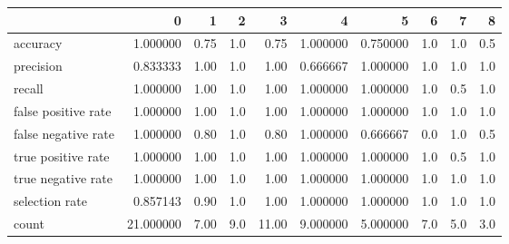 \begin{tabular}{lrrrrrrrrr}
\toprule
{} &          0 &     1 &    2 &      3 &         4 &         5 &    6 &    7 &    8 \\
\midrule
accuracy            &   1.000000 &  0.75 &  1.0 &   0.75 &  1.000000 &  0.750000 &  1.0 &  1.0 &  0.5 \\
precision           &   0.833333 &  1.00 &  1.0 &   1.00 &  0.666667 &  1.000000 &  1.0 &  1.0 &  1.0 \\
recall              &   1.000000 &  1.00 &  1.0 &   1.00 &  1.000000 &  1.000000 &  1.0 &  0.5 &  1.0 \\
false positive rate &   1.000000 &  1.00 &  1.0 &   1.00 &  1.000000 &  1.000000 &  1.0 &  1.0 &  1.0 \\
false negative rate &   1.000000 &  0.80 &  1.0 &   0.80 &  1.000000 &  0.666667 &  0.0 &  1.0 &  0.5 \\
true positive rate  &   1.000000 &  1.00 &  1.0 &   1.00 &  1.000000 &  1.000000 &  1.0 &  0.5 &  1.0 \\
true negative rate  &   1.000000 &  1.00 &  1.0 &   1.00 &  1.000000 &  1.000000 &  1.0 &  1.0 &  1.0 \\
selection rate      &   0.857143 &  0.90 &  1.0 &   1.00 &  1.000000 &  1.000000 &  1.0 &  1.0 &  1.0 \\
count               &  21.000000 &  7.00 &  9.0 &  11.00 &  9.000000 &  5.000000 &  7.0 &  5.0 &  3.0 \\
\bottomrule
\end{tabular}
